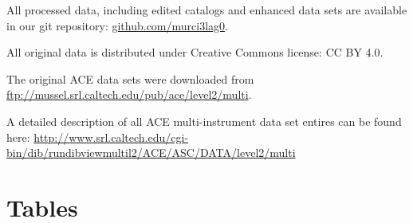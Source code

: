 \documentclass[utf8]{frontiersSCNS} %
\begin{document}
All processed data, including edited catalogs and enhanced data sets are available in our git repository: \href{http://github.com/murci3lag0}{github.com/murci3lag0}.

All original data is distributed under Creative Commons license: CC BY 4.0.

The original ACE data sets were downloaded from \href{ftp://mussel.srl.caltech.edu/pub/ace/level2/multi}{ftp://mussel.srl.caltech.edu/pub/ace/level2/multi}.

A detailed description of all ACE multi-instrument data set entires can be found here: \href{http://www.srl.caltech.edu/cgi-bin/dib/rundibviewmultil2/ACE/ASC/DATA/level2/multi}{http://www.srl.caltech.edu/cgi-bin/dib/rundibviewmultil2/ACE/ASC/DATA/level2/multi}





\section*{Tables}
\end{document}
